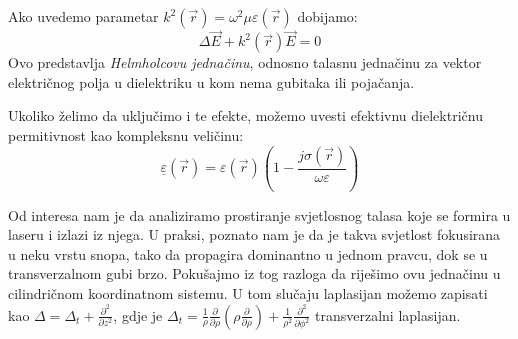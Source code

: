 \documentclass[fleqn]{report}
\begin{document}
Ako uvedemo parametar $k^2(\vec r) = \omega^2\mu\varepsilon(\vec r)$ dobijamo:
\begin{equation*}
    \Delta\vec E + k^2(\vec r)\vec E = 0
\end{equation*}
Ovo predstavlja \emph{Helmholcovu jednačinu}, odnosno talasnu jednačinu za vektor električnog polja u dielektriku u kom nema gubitaka ili pojačanja.
\begin{tbox}
    Ukoliko želimo da uključimo i te efekte, možemo uvesti efektivnu dielektričnu permitivnost kao kompleksnu veličinu:
    \begin{equation*}
        \underline{\varepsilon}(\vec r) = \varepsilon(\vec r)\left(1 - \frac{j\sigma(\vec r)}{\omega\varepsilon}\right)
    \end{equation*}
\end{tbox}
Od interesa nam je da analiziramo prostiranje svjetlosnog talasa koje se formira u laseru i izlazi iz njega.
U praksi, poznato nam je da je takva svjetlost fokusirana u neku vrstu snopa, tako da propagira dominantno u jednom pravcu, dok se u transverzalnom gubi brzo.
Pokušajmo iz tog razloga da riješimo ovu jednačinu u cilindričnom koordinatnom sistemu.
U tom slučaju laplasijan možemo zapisati kao $\Delta = \Delta_t + \frac{\partial^2}{\partial z^2}$, gdje je $\Delta_t = \frac{1}{\rho}\frac{\partial}{\partial \rho} \left( \rho\frac{\partial}{\partial\rho} \right) + \frac{1}{\rho^2}\frac{\partial^2}{\partial\phi^2}$ transverzalni laplasijan.
\end{document}
